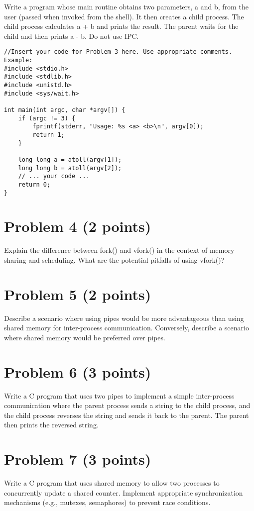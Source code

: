 \documentclass{article}
\begin{document}
Write a program whose main routine obtains two parameters, a and b, from the user (passed when invoked from the shell).  It then creates a child process. The child process calculates a + b and prints the result. The parent waits for the child and then prints a - b. Do not use IPC.

\begin{verbatim}
//Insert your code for Problem 3 here. Use appropriate comments. Example:
#include <stdio.h>
#include <stdlib.h>
#include <unistd.h>
#include <sys/wait.h>

int main(int argc, char *argv[]) {
    if (argc != 3) {
        fprintf(stderr, "Usage: %s <a> <b>\n", argv[0]);
        return 1;
    }

    long long a = atoll(argv[1]);
    long long b = atoll(argv[2]);
    // ... your code ...
    return 0;
}
\end{verbatim}

\section*{Problem 4 (2 points)}
Explain the difference between fork() and vfork() in the context of memory sharing and scheduling.  What are the potential pitfalls of using vfork()?


\section*{Problem 5 (2 points)}
Describe a scenario where using pipes would be more advantageous than using shared memory for inter-process communication.  Conversely, describe a scenario where shared memory would be preferred over pipes.


\section*{Problem 6 (3 points)}
Write a C program that uses two pipes to implement a simple inter-process communication where the parent process sends a string to the child process, and the child process reverses the string and sends it back to the parent. The parent then prints the reversed string.


\section*{Problem 7 (3 points)}
Write a C program that uses shared memory to allow two processes to concurrently update a shared counter.  Implement appropriate synchronization mechanisms (e.g., mutexes, semaphores) to prevent race conditions.
\end{document}
